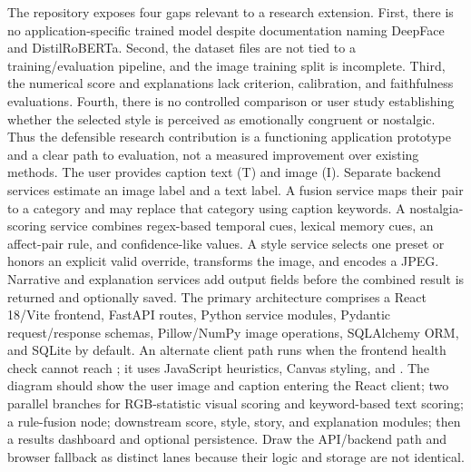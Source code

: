 \documentclass[conference]{IEEEtran}
\begin{document}
{}
\markdownRendererSectionEnd \markdownRendererSectionBegin
{}\markdownRendererInterblockSeparator
{}The repository exposes four gaps relevant to a research extension. First, there is no application-specific trained model despite documentation naming DeepFace and DistilRoBERTa. Second, the dataset files are not tied to a training/evaluation pipeline, and the image training split is incomplete. Third, the numerical score and explanations lack criterion, calibration, and faithfulness evaluations. Fourth, there is no controlled comparison or user study establishing whether the selected style is perceived as emotionally congruent or nostalgic. Thus the defensible research contribution is a functioning application prototype and a clear path to evaluation, not a measured improvement over existing methods.\markdownRendererInterblockSeparator
{}
\markdownRendererSectionEnd 
\markdownRendererSectionEnd \markdownRendererSectionBegin
{}\markdownRendererInterblockSeparator
{}\markdownRendererSectionBegin
{}\markdownRendererInterblockSeparator
{}The user provides caption text (T) and image (I). Separate backend services estimate an image label and a text label. A fusion service maps their pair to a category and may replace that category using caption keywords. A nostalgia-scoring service combines regex-based temporal cues, lexical memory cues, an affect-pair rule, and confidence-like values. A style service selects one preset or honors an explicit valid override, transforms the image, and encodes a JPEG. Narrative and explanation services add output fields before the combined result is returned and optionally saved.\markdownRendererInterblockSeparator
{}
\markdownRendererSectionEnd \markdownRendererSectionBegin
{}\markdownRendererInterblockSeparator
{}The primary architecture comprises a React 18/Vite frontend, FastAPI routes, Python service modules, Pydantic request/response schemas, Pillow/NumPy image operations, SQLAlchemy ORM, and SQLite by default. An alternate client path runs when the frontend health check cannot reach ; it uses JavaScript heuristics, Canvas styling, and .\markdownRendererParagraphSeparator
{} The diagram should show the user image and caption entering the React client; two parallel branches for RGB-statistic visual scoring and keyword-based text scoring; a rule-fusion node; downstream score, style, story, and explanation modules; then a results dashboard and optional persistence. Draw the API/backend path and browser fallback as distinct lanes because their logic and storage are not identical.\markdownRendererInterblockSeparator
\end{document}
